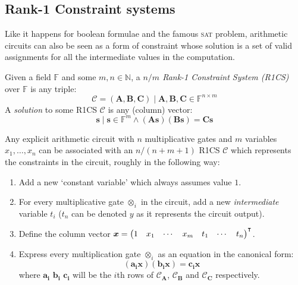\subsection{Rank-1 Constraint systems}
Like it happens for boolean formulae and the famous \textsc{sat} problem, arithmetic circuits can
also be seen as a form of constraint whose solution is a set of valid assignments for all the
intermediate values in the computation.
\begin{definition}
	Given a field \(\mathbb{F}\) and some \(m, n \in \mathbb{N}\), a
	\emph{\(n/m\) Rank-1 Constraint System (R1CS)} over \(\mathbb{F}\) is any triple:
	\[\mathcal{C} = \left(\bm{A}, \bm{B}, \bm{C}\right) \mid \bm{A}, \bm{B}, \bm{C} \in \mathbb{F}^{n
			\times m} \]
	A \emph{solution} to some R1CS \(\mathcal{C}\) is any (column) vector:
	\[\bm{s} \mid \bm{s} \in \mathbb{F}^m \land
		\left(\bm{A}\bm{s}\right)\left(\bm{B}\bm{s}\right) = \bm{C}\bm{s} \]
\end{definition}

\noindent Any explicit arithmetic circuit with \(n\) multiplicative gates and \(m\) variables
\(x_1, \dots, x_n\) can be associated with an \(n/\left(n+m+1\right)\) R1CS \(\mathcal{C}\) which
represents the constraints in the circuit, roughly in the following way:
\begin{enumerate}
	\item Add a new `constant variable' which always assumes value \(1\).
	\item For every multiplicative gate \(\otimes_i \) in the circuit, add a new \emph{intermediate}
	      variable \(t_i\) (\(t_n\) can be denoted \(y\) as it represents the circuit output).
	\item Define the column vector
	      \(\bm{x} = {\begin{pmatrix}1 & x_1 & \cdots & x_m & t_1 & \cdots & t_n
	      \end{pmatrix}}^\transpose \).
	\item Express every multiplication gate \(\otimes_i \) as an equation in the canonical form:
	      \[\left(\bm{a_i}\bm{x}\right)\left(\bm{b_i}\bm{x}\right) = \bm{c_i}\bm{x}\]
	      where \(\bm{a_i}\) \(\bm{b_i}\) \(\bm{c_i}\) will be the \(i\)th rows of
	      \(\mathcal{C}_{\bm{A}}\), \(\mathcal{C}_{\bm{B}}\) and \(\mathcal{C}_{\bm{C}}\) respectively.
\end{enumerate}

